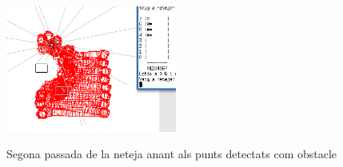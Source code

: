 \begin{figure}[H]
\begin{center}\label{figescenari}
 \includegraphics[width=0.5\textwidth]{diagrames/figures/netejant-aobstacles.png}
\end{center}
  \caption{Segona passada de la neteja anant als punts detectats com obstacle}
\end{figure}

